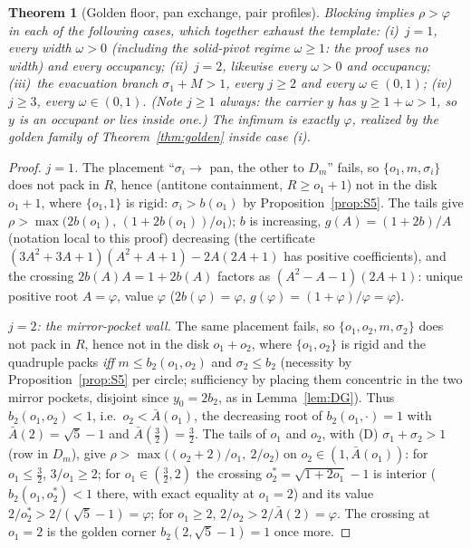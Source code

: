 \documentclass[11pt]{article}
\newtheorem{theorem}{Theorem}
\theoremstyle{definition}
\begin{document}
\begin{theorem}[Golden floor, pan exchange, pair profiles]
\label{thm:DP}
Blocking implies $\rho>\varphi$ in each of the following cases, which
together exhaust the template: (i)~$j=1$, every width $\omega>0$
(including the solid-pivot regime $\omega\ge1$: the proof uses no width)
and every occupancy; (ii)~$j=2$, likewise every $\omega>0$ and occupancy;
(iii)~the evacuation branch $\sigma_1+M>1$, every $j\ge2$ and every
$\omega\in(0,1)$; (iv)~$j\ge3$, every $\omega\in(0,1)$. (Note $j\ge1$
always: the carrier $y$ has $y\ge1+\omega>1$, so $y$ is an occupant or
lies inside one.) The infimum is exactly $\varphi$, realized by the
golden family of Theorem~\ref{thm:golden} inside case (i).
\end{theorem}
\begin{proof}
\emph{$j=1$.} The placement ``$\sigma_i\to$ pan, the other to $D_m$''
fails, so $\{o_1,m,\sigma_i\}$ does not pack in $R$, hence (antitone
containment, $R\ge o_1+1$) not in the disk $o_1+1$, where
$\{o_1,1\}$ is rigid: $\sigma_i>b(o_1)$ by
Proposition~\ref{prop:S5}. The tails give
$\rho>\max\bigl(2b(o_1),\,(1+2b(o_1))/o_1\bigr)$; $b$ is increasing,
$g(A)=(1+2b)/A$ (notation local to this proof) decreasing (the certificate
$(3A^2+3A+1)(A^2+A+1)-2A(2A+1)$ has positive coefficients), and the
crossing $2b(A)A=1+2b(A)$ factors as $(A^2-A-1)(2A+1)$: unique positive
root $A=\varphi$, value $\varphi$ ($2b(\varphi)=\varphi$,
$g(\varphi)=(1+\varphi)/\varphi=\varphi$).

\emph{$j=2$: the mirror-pocket wall.} The same placement fails, so
$\{o_1,o_2,m,\sigma_2\}$ does not pack in $R$, hence not in the disk
$o_1+o_2$, where $\{o_1,o_2\}$ is rigid and the quadruple packs
\emph{iff} $m\le b_2(o_1,o_2)$ and $\sigma_2\le b_2$ (necessity by
Proposition~\ref{prop:S5} per circle; sufficiency by placing them
concentric in the two mirror pockets, disjoint since $y_0=2b_2$, as in
Lemma~\ref{lem:DG}). Thus $b_2(o_1,o_2)<1$, i.e.\ $o_2<\bar A(o_1)$,
the decreasing root of $b_2(o_1,\cdot)=1$ with $\bar A(2)=\sqrt5-1$ and
$\bar A(\tfrac32)=\tfrac32$. The tails of $o_1$ and $o_2$, with (D)
$\sigma_1+\sigma_2>1$ (row in $D_m$), give
$\rho>\max\bigl((o_2+2)/o_1,\ 2/o_2\bigr)$ on $o_2\in(1,\bar A(o_1))$:
for $o_1\le\tfrac32$, $3/o_1\ge2$; for $o_1\in(\tfrac32,2)$ the
crossing $o_2^\ast=\sqrt{1+2o_1}-1$ is interior
($b_2(o_1,o_2^\ast)<1$ there, with exact equality at $o_1=2$) and its
value $2/o_2^\ast>2/(\sqrt5-1)=\varphi$; for $o_1\ge2$,
$2/o_2>2/\bar A(2)=\varphi$. The crossing at $o_1=2$ is the golden
corner $b_2(2,\sqrt5-1)=1$ once more.


\end{proof}
\end{document}
